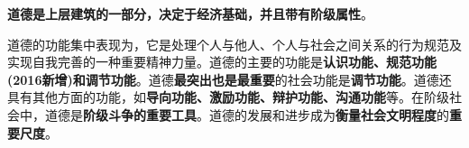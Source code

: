 {{\textbf{道德是上层建筑的一部分，决定于经济基础，并且带有阶级属性}}。}

{{道德的功能集中表现为，它是处理个人与他人、个人与社会之间关系的行为规范及实现自我完善的一种重要精神力量。}道德的主要的功能是{\textbf{认识功能、规范功能(2016新增)和调节功能}}{。道德}\textbf{{最突出也是最重要}}{的社会功能是}\textbf{{调节功能}}{。道德还具有}其他方面的功能，如{\textbf{导向功能、激励功能、辩护功能、沟通功能}}{等。在阶级社会中，}道德是{\textbf{阶级斗争的重要工具}}{。}道德的发展和进步成为\textbf{{衡量社会文明程度}}的{\textbf{重要尺度}}{。}}

